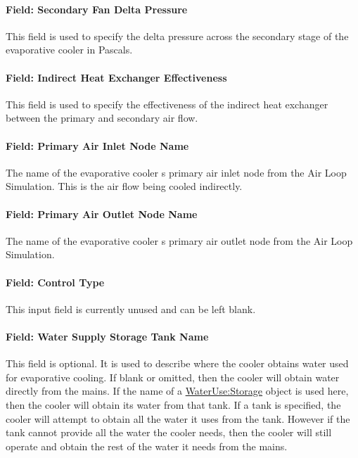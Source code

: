 \paragraph{Field: Secondary Fan Delta Pressure}\label{field-secondary-fan-delta-pressure}

This field is used to specify the delta pressure across the secondary stage of the evaporative cooler in Pascals.

\paragraph{Field: Indirect Heat Exchanger Effectiveness}\label{field-indirect-heat-exchanger-effectiveness}

This field is used to specify the effectiveness of the indirect heat exchanger between the primary and secondary air flow.

\paragraph{Field: Primary Air Inlet Node Name}\label{field-primary-air-inlet-node-name-000}

The name of the evaporative cooler s primary air inlet node from the Air Loop Simulation. This is the air flow being cooled indirectly.

\paragraph{Field: Primary Air Outlet Node Name}\label{field-primary-air-outlet-node-name-000}

The name of the evaporative cooler s primary air outlet node from the Air Loop Simulation.

\paragraph{Field: Control Type}\label{field-control-type-1}

This input field is currently unused and can be left blank.

\paragraph{Field: Water Supply Storage Tank Name}\label{field-water-supply-storage-tank-name-2}

This field is optional. It is used to describe where the cooler obtains water used for evaporative cooling. If blank or omitted, then the cooler will obtain water directly from the mains. If the name of a \hyperref[waterusestorage]{WaterUse:Storage} object is used here, then the cooler will obtain its water from that tank. If a tank is specified, the cooler will attempt to obtain all the water it uses from the tank. However if the tank cannot provide all the water the cooler needs, then the cooler will still operate and obtain the rest of the water it needs from the mains.


